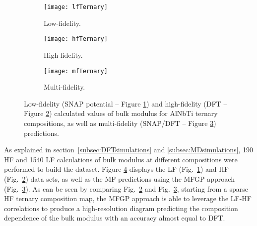 \documentclass[%
 reprint,
aip,jcp
]{revtex4-1}
\begin{document}
\begin{figure}[!htbp]

\centering
\begin{subfigure}[b]{0.50\textwidth}
	\centering
	\texttt{[image: lfTernary]}
	\caption{Low-fidelity.}
	\label{fig:cropped_lfTernary0K}
\end{subfigure}
\hfill
\begin{subfigure}[b]{0.50\textwidth}
	\texttt{[image: hfTernary]}
	\caption{High-fidelity.}
	\label{fig:cropped_hfTernary0K}
\end{subfigure}
\hfill
\begin{subfigure}[b]{0.50\textwidth}
	\texttt{[image: mfTernary]}
	\caption{Multi-fidelity.}
	\label{fig:cropped_mfTernary0K}
\end{subfigure}
\vfill

\caption{Low-fidelity (SNAP potential -- Figure \ref{fig:cropped_lfTernary0K}) and 
  high-fidelity (DFT -- Figure \ref{fig:cropped_hfTernary0K}) calculated values of bulk modulus for AlNbTi ternary compositions, as well as multi-fidelity (SNAP/DFT -- Figure \ref{fig:cropped_mfTernary0K}) 
  predictions. 
}
\label{fig:LfHfMfpredictions}
\end{figure}

As explained in section~\ref{subsec:DFTsimulations} and
\ref{subsec:MDsimulations}, 190 HF and 1540 LF calculations of 
bulk modulus at different compositions were performed to build 
the dataset. Figure \ref{fig:LfHfMfpredictions} displays the LF
(Fig.~\ref{fig:cropped_lfTernary0K}) and HF 
(Fig.~\ref{fig:cropped_hfTernary0K}) data sets, as well as the MF
predictions using the MFGP approach 
(Fig.~\ref{fig:cropped_mfTernary0K}).
As can be seen by comparing Fig.~\ref{fig:cropped_hfTernary0K} and 
Fig.~\ref{fig:cropped_mfTernary0K}, 
starting from a sparse HF ternary composition map, 
the MFGP approach is able to
leverage the LF-HF correlations to produce a high-resolution diagram predicting the composition dependence of the bulk 
modulus with an accuracy almost equal to DFT.
\end{document}
